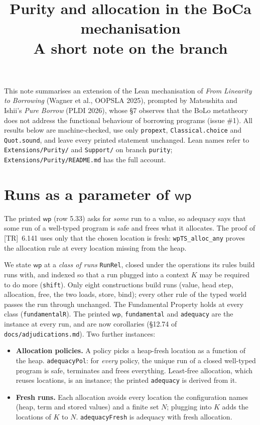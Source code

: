 \documentclass[10pt]{article}
\title{Purity and allocation in the BoCa mechanisation\\[2pt]
\large A short note on the \lean{Extensions/Purity} branch}
\author{}\date{}
\newcommand{\lean}[1]{\texttt{#1}}
\renewcommand{\wp}{\mathsf{wp}}
\begin{document}
\maketitle
\vspace{-2em}

\noindent
This note summarises an extension of the Lean mechanisation of \emph{From Linearity to
Borrowing} (Wagner et al., OOPSLA 2025), prompted by Matsushita and Ishii's \emph{Pure Borrow}
(PLDI 2026), whose \S7 observes that the BoLo metatheory does not address the functional
behaviour of borrowing programs (issue \#1). All results below are machine-checked, use only
\lean{propext}, \lean{Classical.choice} and \lean{Quot.sound}, and leave every printed statement
unchanged. Lean names refer to \lean{Extensions/Purity/} and \lean{Support/} on branch
\lean{purity}; \lean{Extensions/Purity/README.md} has the full account.

\section{Runs as a parameter of \texorpdfstring{$\wp$}{wp}}

The printed $\wp$ (row 5.33) asks for \emph{some} run to a value, so adequacy says that some run
of a well-typed program is safe and frees what it allocates. The proof of \textsc{[TR]}~6.141
uses only that the chosen location is fresh: \lean{wpTS\_alloc\_any} proves the allocation rule
at every location missing from the heap.

We state $\wp$ at a \emph{class of runs} \lean{RunRel}, closed under the operations its rules
build runs with, and indexed so that a run plugged into a context $K$ may be required to do
more (\lean{shift}). Only eight constructions build runs (value, head step, allocation, free,
the two loads, store, bind); every other rule of the typed world passes the run through
unchanged. The Fundamental Property holds at every class (\lean{fundamentalR}). The printed
$\wp$, \lean{fundamental} and \lean{adequacy} are the instance at every run, and are now
corollaries (\S12.74 of \lean{docs/adjudications.md}). Two further instances:

\begin{itemize}
\item \textbf{Allocation policies.} A policy picks a heap-fresh location as a function of the
  heap. \lean{adequacyPol}: for \emph{every} policy, the unique run of a closed well-typed
  program is safe, terminates and frees everything. Least-free allocation, which reuses
  locations, is an instance; the printed \lean{adequacy} is derived from it.
\item \textbf{Fresh runs.} Each allocation avoids every location the configuration names (heap,
  term and stored values) and a finite set $N$; plugging into $K$ adds the locations of $K$
  to $N$. \lean{adequacyFresh} is adequacy with fresh allocation.
\end{itemize}
\end{document}
